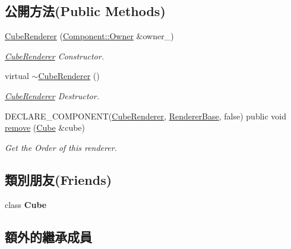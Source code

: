 \subsection*{公開方法(Public Methods)}
\begin{DoxyCompactItemize}
\item 
\hyperlink{class_magnum_1_1_cube_renderer_a538ada54c52c792555b2205dd7568d09}{Cube\+Renderer} (\hyperlink{class_magnum_1_1_component_1_1_owner}{Component\+::\+Owner} \&owner\+\_\+)
\begin{DoxyCompactList}\small\item\em \hyperlink{class_magnum_1_1_cube_renderer}{Cube\+Renderer} Constructor. \end{DoxyCompactList}\item 
virtual \hyperlink{class_magnum_1_1_cube_renderer_ae24a7fda5b2b2db4fe36d8d0343e7de9}{$\sim$\+Cube\+Renderer} ()
\begin{DoxyCompactList}\small\item\em \hyperlink{class_magnum_1_1_cube_renderer}{Cube\+Renderer} Destructor. \end{DoxyCompactList}\item 
D\+E\+C\+L\+A\+R\+E\+\_\+\+C\+O\+M\+P\+O\+N\+E\+NT(\hyperlink{class_magnum_1_1_cube_renderer}{Cube\+Renderer}, \hyperlink{class_magnum_1_1_renderer_base}{Renderer\+Base}, false) public void \hyperlink{class_magnum_1_1_cube_renderer_a0ee1e417798a21ad7276c90d327226ed}{remove} (\hyperlink{class_magnum_1_1_cube}{Cube} \&cube)
\begin{DoxyCompactList}\small\item\em Get the Order of this renderer. \end{DoxyCompactList}\end{DoxyCompactItemize}
\subsection*{類別朋友(Friends)}
\begin{DoxyCompactItemize}
\item 
class {\bfseries Cube}\hypertarget{class_magnum_1_1_cube_renderer_a8faee6be39d1c71eee071a7874631653}{}\label{class_magnum_1_1_cube_renderer_a8faee6be39d1c71eee071a7874631653}

\end{DoxyCompactItemize}
\subsection*{額外的繼承成員}


